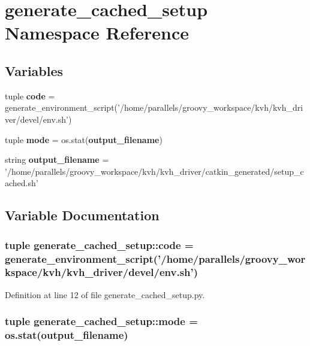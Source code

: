 \section{generate\-\_\-cached\-\_\-setup \-Namespace \-Reference}
\label{namespacegenerate__cached__setup}
\subsection*{\-Variables}
\begin{DoxyCompactItemize}
\item 
tuple {\bf code} = generate\-\_\-environment\-\_\-script('/home/parallels/groovy\-\_\-workspace/kvh/kvh\-\_\-driver/devel/env.\-sh')
\item 
tuple {\bf mode} = os.\-stat({\bf output\-\_\-filename})
\item 
string {\bf output\-\_\-filename} = '/home/parallels/groovy\-\_\-workspace/kvh/kvh\-\_\-driver/catkin\-\_\-generated/setup\-\_\-cached.\-sh'
\end{DoxyCompactItemize}


\subsection{\-Variable \-Documentation}
\subsubsection[{code}]{\setlength{\rightskip}{0pt plus 5cm}tuple {\bf generate\-\_\-cached\-\_\-setup\-::code} = generate\-\_\-environment\-\_\-script('/home/parallels/groovy\-\_\-workspace/kvh/kvh\-\_\-driver/devel/env.\-sh')}\label{namespacegenerate__cached__setup_addcec96a295a686731bd38e0d17c22fa}


\-Definition at line 12 of file generate\-\_\-cached\-\_\-setup.\-py.

\subsubsection[{mode}]{\setlength{\rightskip}{0pt plus 5cm}tuple {\bf generate\-\_\-cached\-\_\-setup\-::mode} = os.\-stat({\bf output\-\_\-filename})}\label{namespacegenerate__cached__setup_ab69771980c7a74aa5a3c182fe4bf16d8}


